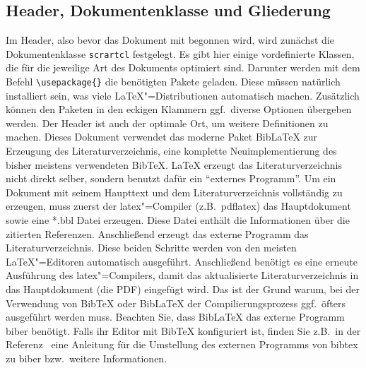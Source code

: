 \subsection{Header, Dokumentenklasse und Gliederung}
\label{subsec:DokHeadGli}
Im Header, also bevor das Dokument mit \verb++ begonnen wird, wird zunächst die Dokumentenklasse \verb+scrartcl+ festgelegt. Es gibt hier einige vordefinierte Klassen, die für die jeweilige Art des Dokuments optimiert sind. Darunter werden mit dem Befehl \verb+\usepackage{}+ die benötigten Pakete geladen. Diese müssen natürlich installiert sein, was viele \LaTeX"=Distributionen automatisch machen. Zusätzlich können den Paketen in den eckigen Klammern ggf.\ diverse Optionen übergeben werden. Der Header ist auch der optimale Ort, um weitere Definitionen zu machen.
Dieses Dokument verwendet das moderne Paket BibLaTeX zur Erzeugung des Literaturverzeichnis, eine komplette Neuimplementierung des bisher meistens verwendeten BibTeX. \LaTeX{} erzeugt das Literaturverzeichnis nicht direkt selber, sondern benutzt dafür ein "`externes Programm"'. Um ein Dokument mit seinem Haupttext und dem Literaturverzeichnis vollständig zu erzeugen, muss zuerst der latex"=Compiler (z.B.\ pdflatex) das Hauptdokument sowie eine *.bbl Datei erzeugen. Diese Datei enthält die Informationen über die zitierten Referenzen. Anschließend erzeugt das externe Programm das Literaturverzeichnis. Diese beiden Schritte werden von den meisten \LaTeX"=Editoren automatisch ausgeführt. Anschließend benötigt es eine erneute Ausführung des latex"=Compilers, damit das aktualisierte Literaturverzeichnis in das Hauptdokument (die PDF) eingefügt wird. Das ist der Grund warum, bei der Verwendung von BibTeX oder BibLaTeX der Compilierungsprozess ggf.\ öfters ausgeführt werden muss. Beachten Sie, dass BibLaTeX das externe Programm biber benötigt. Falls ihr Editor mit BibTeX konfiguriert ist, finden Sie z.B.\ in der Referenz~\cite{bibtextobiber,biblatex} eine Anleitung für die Umstellung des externen Programms von bibtex zu biber bzw.\ weitere Informationen.
